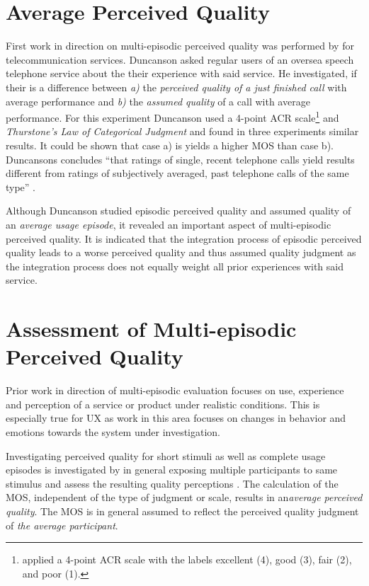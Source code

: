 \section{Average Perceived Quality \citep{duncanson_average_1969}}
First work in direction on multi-episodic perceived quality was performed by \cite{duncanson_average_1969} for telecommunication services.
Duncanson asked regular users of an oversea speech telephone service about the their experience with said service.
He investigated, if their is a difference between \emph{a)} the \emph{perceived quality of a just finished call} with average performance and \emph{b)} the \emph{assumed quality} of a call with average performance.
For this experiment Duncanson used a 4-point \ac{ACR} scale\footnote{\cite{duncanson_average_1969} applied a 4-point \ac{ACR} scale with the labels excellent (4), good (3), fair (2), and poor (1).} and \emph{Thurstone's Law of Categorical Judgment} and found in three experiments similar results.
It could be shown that case a) is yields a higher \ac{MOS} than case b).
Duncansons concludes ``that ratings of single, recent telephone calls yield results different from ratings of subjectively averaged, past telephone calls of the same type'' \citep[][p. 116]{duncanson_average_1969}.

Although Duncanson studied episodic perceived quality and assumed quality of an \emph{average usage episode}, it revealed an important aspect of multi-episodic perceived quality.
It is indicated that the integration process of episodic perceived quality leads to a worse perceived quality and thus assumed quality judgment as the integration process does not equally weight all prior experiences with said service.

\section{Assessment of Multi-episodic Perceived Quality}
Prior work in direction of multi-episodic evaluation focuses on use, experience and perception of a service or product under realistic conditions.
This is especially true for \ac{UX} as work in this area focuses on changes in behavior and emotions towards the system under investigation.

Investigating perceived quality for short stimuli as well as complete usage episodes is investigated by in general exposing multiple participants to same stimulus and assess the resulting quality perceptions \citep[\cf][p. 11]{blauert_spatial_1996}. %
The calculation of the \ac{MOS}, independent of the type of judgment or scale, results in an\emph{average perceived quality}.
The \ac{MOS} is in general assumed to reflect the perceived quality judgment of \emph{the average participant}.

